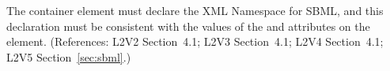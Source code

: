 The  container element must declare the XML Namespace
for SBML, and this declaration must be consistent with the values
of the  and  attributes on the 
 element.  (References: L2V2 Section~4.1;
L2V3 Section~4.1; L2V4 Section~4.1; L2V5 Section~\ref{sec:sbml}.)
